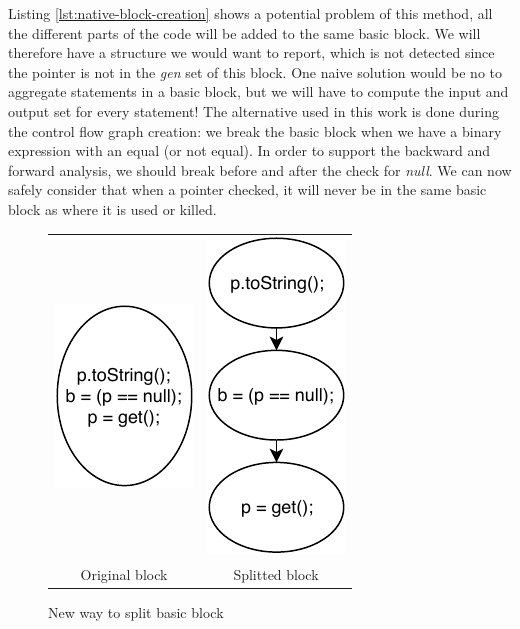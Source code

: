 Listing \ref{lst:native-block-creation} shows a potential problem of this method, all the different parts of the code will be added to the same basic block.
We will therefore have a structure we would want to report, which is not detected since the pointer is not in the \emph{gen} set of this block. 
One naive solution would be no to aggregate statements in a basic block, but we will have to compute the input and output set for every statement! 
\newline
The alternative used in this work is done during the control flow graph creation: we break the basic block when we have a binary expression with an equal (or not equal). 
In order to support the backward and forward analysis, we should break before and after the check for \emph{null}. 
We can now safely consider that when a pointer checked, it will never be in the same basic block as where it is used or killed.
\begin{figure}[h]
\caption{New way to split basic block}
\label{figure:new-way-to-split}
\setlength{\tabcolsep}{24pt}
	\begin{tabular}{cc}
		\includegraphics[]{figure/original-block-cfg.pdf}  &
		\includegraphics[]{figure/splitted-block-cfg.pdf}   \\ 
		Original block & Splitted block
	\end{tabular}
\end{figure}

